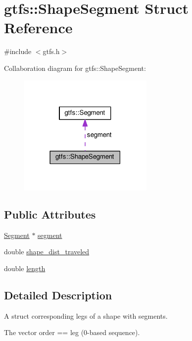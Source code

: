 \hypertarget{structgtfs_1_1ShapeSegment}{}\section{gtfs\+:\+:Shape\+Segment Struct Reference}
\label{structgtfs_1_1ShapeSegment}


{\ttfamily \#include $<$gtfs.\+h$>$}



Collaboration diagram for gtfs\+:\+:Shape\+Segment\+:
\nopagebreak
\begin{figure}[H]
\begin{center}
\leavevmode
\includegraphics[width=186pt]{structgtfs_1_1ShapeSegment__coll__graph}
\end{center}
\end{figure}
\subsection*{Public Attributes}
\begin{DoxyCompactItemize}
\item 
\hyperlink{classgtfs_1_1Segment}{Segment} $\ast$ \hyperlink{structgtfs_1_1ShapeSegment_a30eb5db589498e40bb110402314a602b}{segment}
\item 
double \hyperlink{structgtfs_1_1ShapeSegment_a64afdd03235b9bc256fc18652c6f9c47}{shape\+\_\+dist\+\_\+traveled}
\item 
double \hyperlink{structgtfs_1_1ShapeSegment_ac1ec581b6fa1a1dec3f442cd592bfccb}{length}
\end{DoxyCompactItemize}


\subsection{Detailed Description}
A struct corresponding legs of a shape with segments.

The vector order == leg (0-\/based sequence). 

